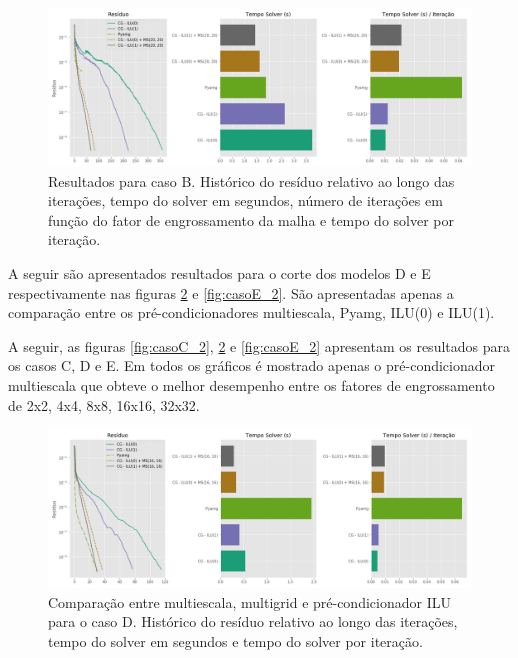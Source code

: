 \begin{figure}[!htbp]
\caption{Resultados para caso B. Histórico do resíduo relativo ao longo das iterações, tempo do solver em segundos, número de iterações em função do fator de engrossamento da malha e tempo do solver por iteração. }
\label{fig:reservatorio320x320_2}
\centering
\includegraphics[width=\textwidth]{chap08/figs/reservatorio320x320_2.png}
\end{figure}


A seguir são apresentados resultados para o corte dos modelos D e E respectivamente nas figuras \ref{fig:casoD_2} e \ref{fig:casoE_2}. 
São apresentadas apenas a comparação entre os pré-condicionadores multiescala, Pyamg, ILU(0) e ILU(1). 


A seguir, as figuras \ref{fig:casoC_2}, \ref{fig:casoD_2} e \ref{fig:casoE_2} apresentam os resultados para os casos C, D e E. 
Em todos os gráficos é mostrado apenas o pré-condicionador multiescala que obteve o melhor desempenho entre os fatores de engrossamento de 2x2, 4x4, 8x8, 16x16, 32x32.



\begin{figure}[!htbp]
\caption{Comparação entre multiescala, multigrid e pré-condicionador ILU para o caso D. Histórico do resíduo relativo ao longo das iterações, tempo do solver em segundos e tempo do solver por iteração. }
\label{fig:casoD_2}
\centering
\includegraphics[width=\textwidth]{chap08/figs/casoD_2.png}
\end{figure}

